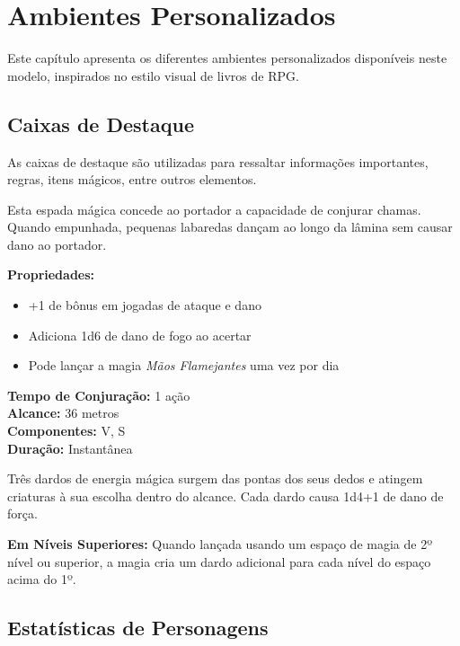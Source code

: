 \chapter{Ambientes Personalizados}

Este capítulo apresenta os diferentes ambientes personalizados disponíveis neste modelo, inspirados no estilo visual de livros de RPG.

\section{Caixas de Destaque}

As caixas de destaque são utilizadas para ressaltar informações importantes, regras, itens mágicos, entre outros elementos.

\begin{magicitem}

Esta espada mágica concede ao portador a capacidade de conjurar chamas. Quando empunhada, pequenas labaredas dançam ao longo da lâmina sem causar dano ao portador.

\textbf{Propriedades:}
\begin{itemize}
    \item +1 de bônus em jogadas de ataque e dano
    \item Adiciona 1d6 de dano de fogo ao acertar
    \item Pode lançar a magia \textit{Mãos Flamejantes} uma vez por dia
\end{itemize}
\end{magicitem}

\begin{spell}

\textbf{Tempo de Conjuração:} 1 ação\\
\textbf{Alcance:} 36 metros\\
\textbf{Componentes:} V, S\\
\textbf{Duração:} Instantânea

Três dardos de energia mágica surgem das pontas dos seus dedos e atingem criaturas à sua escolha dentro do alcance. Cada dardo causa 1d4+1 de dano de força.

\textbf{Em Níveis Superiores:} Quando lançada usando um espaço de magia de 2º nível ou superior, a magia cria um dardo adicional para cada nível do espaço acima do 1º.
\end{spell}

\section{Estatísticas de Personagens}


